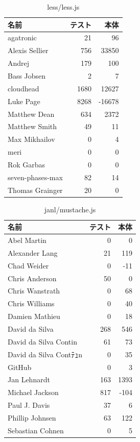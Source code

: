 \begin{table}[htb]
\begin{center}
\caption{less/less.js}
\begin{tabular}{|l|r|r|} \hline 
名前 & テスト & 本体 \\ \hline \hline
agatronic & 21 & 96\\ \hline
Alexis Sellier & 756 & 33850\\ \hline
Andrej & 179 & 100\\ \hline
Bass Jobsen & 2 & 7\\ \hline
cloudhead & 1680 & 12627\\ \hline
Luke Page & 8268 & -16678\\ \hline
Matthew Dean & 634 & 2372\\ \hline
Matthew Smith & 49 & 11\\ \hline
Max Mikhailov & 0 & 4\\ \hline
meri & 0 & 0\\ \hline
Rok Garbas & 0 & 0\\ \hline
seven-phases-max & 82 & 14\\ \hline
Thomas Grainger & 20 & 0\\ \hline
\end{tabular}
\end{center}
\end{table}

\begin{table}[htb]
\begin{center}
\caption{janl/mustache.js}
\begin{tabular}{|l|r|r|} \hline 
名前 & テスト & 本体 \\ \hline \hline
Abel Martin & 0 & 0\\ \hline
Alexander Lang & 21 & 119\\ \hline
Chad Weider & 0 & -11\\ \hline
Chris Anderson & 50 & 0\\ \hline
Chris Wanstrath & 0 & 68\\ \hline
Chris Williams & 0 & 40\\ \hline
Damien Mathieu & 0 & 18\\ \hline
David da Silva & 268 & 546\\ \hline
David da Silva Contin & 61 & 73\\ \hline
David da Silva Contﾃｭn & 0 & 35\\ \hline
GitHub & 0 & 3\\ \hline
Jan Lehnardt & 163 & 1393\\ \hline
Michael Jackson & 817 & -104\\ \hline
Paul J. Davis & 37 & 6\\ \hline
Phillip Johnsen & 63 & 122\\ \hline
Sebastian Cohnen & 0 & 5\\ \hline
\end{tabular}
\end{center}
\end{table}

